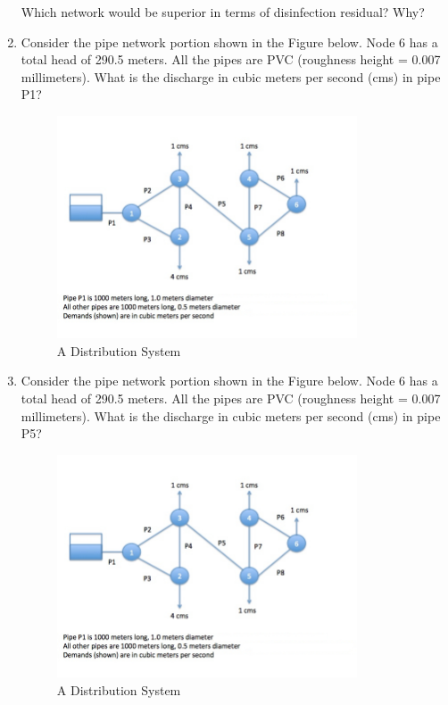 \documentclass[12pt]{article}
\begin{document}
\begin{enumerate}
Which network would be superior in terms of disinfection residual? Why? \\

\item Consider the pipe network portion shown in the Figure below. Node 6 has a total head of 290.5 meters. All the pipes are PVC (roughness height = 0.007 millimeters).  What is the discharge in cubic meters per second (cms) in pipe P1?

\begin{figure}[h!] %
   \centering
   \includegraphics[width=3.5in]{2018Pipeline2.jpg} 
   \caption{A Distribution System}
   \label{fig:placeholder3}
\end{figure}

\item Consider the pipe network portion shown in the Figure below. Node 6 has a total head of 290.5 meters. All the pipes are PVC (roughness height = 0.007 millimeters).  What is the discharge in cubic meters per second (cms) in pipe P5?

\begin{figure}[h!] %
   \centering
   \includegraphics[width=3.5in]{2018Pipeline2.jpg} 
   \caption{A Distribution System}
   \label{fig:placeholder4}
\end{figure}
\clearpage


\end{enumerate}
\end{document}
